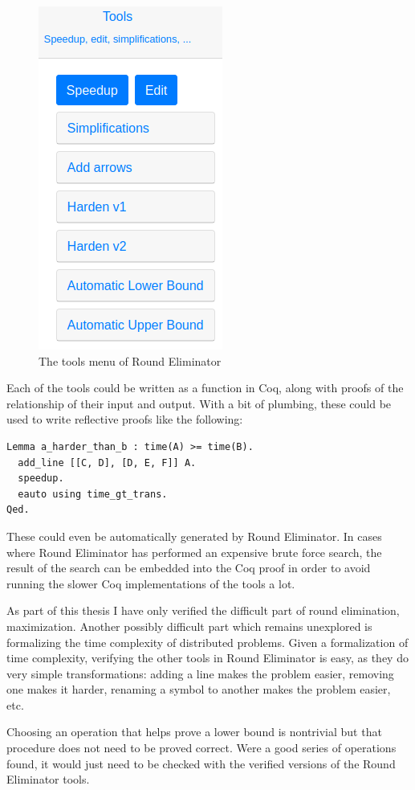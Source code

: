 \documentclass[english, 12pt, a4paper, sci, a-1b, online]{aaltothesis}
\begin{document}
\begin{figure}[h]
  \centering
  \includegraphics[scale=0.5]{retools}
  \caption{The tools menu of Round Eliminator}
\end{figure}

Each of the tools could be written as a function in Coq, along with proofs of the relationship of their input and output. With a bit of plumbing, these could be used to write reflective proofs like the following:

\begin{verbatim}
Lemma a_harder_than_b : time(A) >= time(B).
  add_line [[C, D], [D, E, F]] A.
  speedup.
  eauto using time_gt_trans.
Qed.
\end{verbatim}

These could even be automatically generated by Round Eliminator. In cases where Round Eliminator has performed an expensive brute force search, the result of the search can be embedded into the Coq proof in order to avoid running the slower Coq implementations of the tools a lot.

As part of this thesis I have only verified the difficult part of round elimination, maximization. Another possibly difficult part which remains unexplored is formalizing the time complexity of distributed problems. Given a formalization of time complexity, verifying the other tools in Round Eliminator is easy, as they do very simple transformations: adding a line makes the problem easier, removing one makes it harder, renaming a symbol to another makes the problem easier, etc.

Choosing an operation that helps prove a lower bound is nontrivial but that procedure does not need to be proved correct. Were a good series of operations found, it would just need to be checked with the verified versions of the Round Eliminator tools.

\clearpage
\thesisbibliography{}



\end{document}
